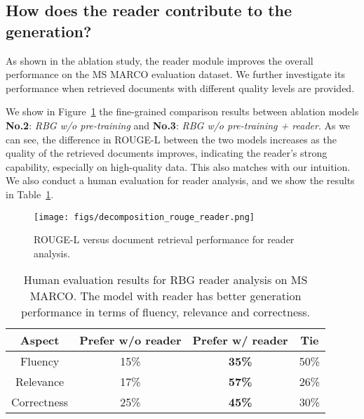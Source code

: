 \documentclass[11pt]{article}
\begin{document}
\vspace{-5pt}
\subsection{How does the reader contribute to the generation?}
\vspace{-5pt}

As shown in the ablation study, the reader module improves the overall performance on the MS MARCO evaluation dataset. We further investigate its performance when retrieved documents with different quality levels are provided. 

We show in Figure~\ref{Fig:decomp_for_reader} the fine-grained comparison results between ablation models  \textbf{No.2}: \textit{RBG w/o pre-training} and \textbf{No.3}: \textit{RBG w/o pre-training + reader}. As we can see, the difference in ROUGE-L between the two models increases as the quality of the retrieved documents improves, indicating the reader's strong capability, especially on high-quality data. This also matches with our intuition. We also conduct a human evaluation for reader analysis, and we show the results in Table~\ref{tab:human eval reader}. 

\begin{figure}[!t]
\vspace{-5pt}
	\begin{center}
		\texttt{[image: figs/decomposition\_rouge\_reader.png]}
		\vspace{-5pt}
		\caption{ROUGE-L versus document retrieval performance for reader analysis.}
		\label{Fig:decomp_for_reader}
	\end{center}
	\vspace{-0.2cm}
\end{figure}




\begin{table}[]
\resizebox{0.48\textwidth}{!}
{
\begin{tabular}{c|ccc}
\hline
Aspect    & Prefer w/o reader      & Prefer w/ reader      &  Tie \\ \hline
Fluency  &    15\%    & \textbf{35\%}   &    50\% \\
Relevance  &  17\%     & \textbf{57\%} &26\% \\
Correctness &  25\%     & \textbf{45\%} & 30\% \\ \hline
\end{tabular}
}
\vspace{-5pt}
\caption{Human evaluation results for RBG reader analysis on MS MARCO. The model with reader has better generation performance in terms of fluency, relevance and correctness.}
\label{tab:human eval reader}
\vspace{-12pt}
\end{table}
\end{document}
